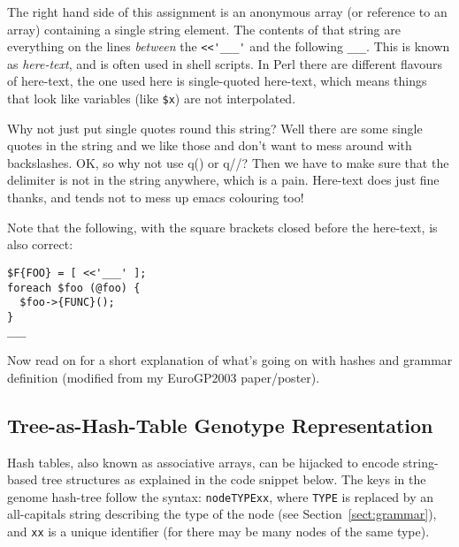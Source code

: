 \documentclass[a4paper]{article}
\begin{document}
The right hand side of this assignment is an anonymous array (or
reference to an array) containing a single string element.  The
contents of that string are everything on the lines \textit{between}
the \verb:<<'___': and the following \verb:___:.  This is known as
\textit{here-text}, and is often used in shell scripts.  In Perl there
are different flavours of here-text, the one used here is
single-quoted here-text, which means things that look like variables
(like \texttt{\$x}) are not interpolated.

Why not just put single quotes round this string?  Well there are some
single quotes in the string and we like those and don't want to mess
around with backslashes.  OK, so why not use q() or q//?  Then we have
to make sure that the delimiter is not in the string anywhere, which
is a pain.  Here-text does just fine thanks, and tends not to mess up
emacs colouring too!

Note that the following, with the square brackets closed before the
here-text, is also correct:

\begin{verbatim}
$F{FOO} = [ <<'___' ];
foreach $foo (@foo) {
  $foo->{FUNC}();
}
___
\end{verbatim}%


Now read on for a short explanation of what's going on with hashes and
grammar definition (modified from my EuroGP2003 paper/poster).

\subsection{Tree-as-Hash-Table Genotype Representation}

Hash tables, also known as associative arrays, can be hijacked to
encode string-based tree structures as explained in
the code snippet below.  The keys in the genome hash-tree follow
the syntax: \texttt{nodeTYPExx}, where \texttt{TYPE} is replaced by an
all-capitals string describing the type of the node (see
Section~\ref{sect:grammar}), and \texttt{xx} is a unique identifier (for
there may be many nodes of the same type).

\end{document}
